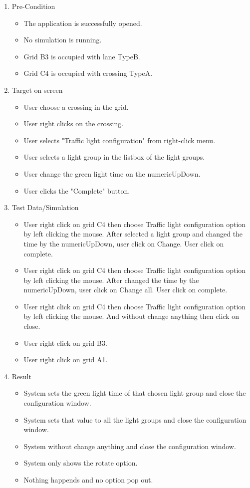 \begin{enumerate}
	\item Pre-Condition
	\begin{itemize}
		\item The application is successfully opened.
		\item No simulation is running.
		\item Grid B3 is occupied with lane TypeB.
		\item Grid C4 is occupied with crossing TypeA.
	\end{itemize}
	\item Target on screen
	\begin{itemize}
		\item User choose a crossing in the grid.
		\item User right clicks on the crossing.
		\item User selects "Traffic light configuration" from right-click menu.
		\item User selects a light group in the listbox of the light groups.
		\item User change the green light time on the numericUpDown.
		\item User clicks the "Complete" button. 
	\end{itemize}
	\item Test Data/Simulation
	\begin{itemize}
		\item User right click on grid C4 then choose Traffic light configuration  option by left clicking the mouse. After selected a light group and changed the time by the numericUpDown, user click on Change. User click on complete.
		\item User right click on grid C4 then choose Traffic light configuration option by left clicking the mouse. After changed the time by the numericUpDown, user click on Change all. User click on complete.
		\item User right click on grid C4 then choose Traffic light configuration option by left clicking the mouse. And without change anything then click on close. 
		\item User right click on grid B3. 
		\item User right click on grid A1.
	\end{itemize}
	\item Result
	\begin{itemize}
		\item System sets the green light time of that chosen light group and close the configuration window. 
		\item System sets that value to all the light groups and close the configuration window. 
		\item System without change anything and close the configuration window.
		\item System only shows the rotate option.
		\item Nothing happends and no option pop out.
		
	\end{itemize}
\end{enumerate}

